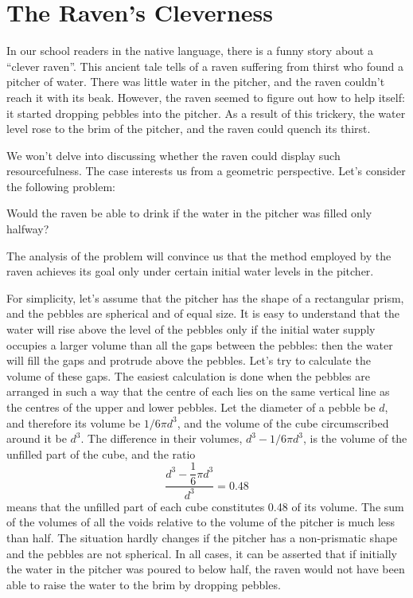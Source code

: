 \clearpage

\section{The Raven's Cleverness}
\label{sec-9.14}

In our school readers in the native language, there is a funny story about a ``clever raven''. This ancient tale tells of a raven suffering from thirst who found a pitcher of water. There was little water in the pitcher, and the raven couldn't reach it with its beak. However, the raven seemed to figure out how to help itself: it started dropping pebbles into the pitcher. As a result of this trickery, the water level rose to the brim of the pitcher, and the raven could quench its thirst.

We won't delve into discussing whether the raven could display such resourcefulness. The case interests us from a geometric perspective. Let's consider the following problem:

\ques Would the raven be able to drink if the water in the pitcher was filled only halfway?



\ans The analysis of the problem will convince us that the method employed by the raven achieves its goal only under certain initial water levels in the pitcher.

For simplicity, let's assume that the pitcher has the shape of a rectangular prism, and the pebbles are spherical and of equal size. It is easy to understand that the water will rise above the level of the pebbles only if the initial water supply occupies a larger volume than all the gaps between the pebbles: then the water will fill the gaps and protrude above the pebbles. Let's try to calculate the volume of these gaps. The easiest calculation is done when the pebbles are arranged in such a way that the centre of each lies on the same vertical line as the centres of the upper and lower pebbles. Let the diameter of a pebble be $d$, and therefore its volume be $1/6 \pi d^{3}$, and the volume of the cube circumscribed around it be $d^{3}$. The difference in their volumes, $d^{3} - 1/6 \pi d^{3}$, is the volume of the unfilled part of the cube, and the ratio 
\begin{equation*}%
\frac{d^{3} - \dfrac{1}{6} \pi d^{3}}{d^{3}} = 0.48
\end{equation*}
means that the unfilled part of each cube constitutes 0.48 of its volume. The sum of the volumes of all the voids relative to the volume of the pitcher is much less than half. The situation hardly changes if the pitcher has a non-prismatic shape and the pebbles are not spherical. In all cases, it can be asserted that if initially the water in the pitcher was poured to below half, the raven would not have been able to raise the water to the brim by dropping pebbles.

